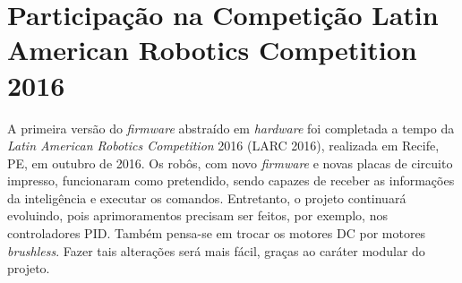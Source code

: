 \chapter{Participação na Competição Latin American Robotics Competition 2016}\label{cap:larc_2016}

A primeira versão do \textit{firmware} abstraído em \textit{hardware} foi completada a tempo da \textit{Latin American Robotics Competition} 2016 (LARC 2016), realizada em Recife, PE, em outubro de 2016. Os robôs, com novo \textit{firmware} e novas placas de circuito impresso, funcionaram como pretendido, sendo capazes de receber as informações da inteligência e executar os comandos. Entretanto, o projeto continuará evoluindo, pois aprimoramentos precisam ser feitos, por exemplo, nos controladores PID. Também pensa-se em trocar os motores DC por motores \textit{brushless}. Fazer tais alterações será mais fácil, graças ao caráter modular do projeto.



